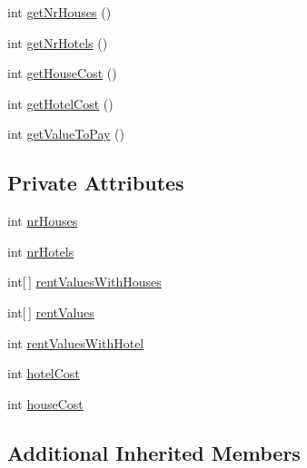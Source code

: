 \begin{DoxyCompactItemize}
\item 
int \hyperlink{class_monopoly_1_1_logic_1_1_normal_property_a17994f04f81b1494dcc4dec0b30c1bca}{get\+Nr\+Houses} ()
\item 
int \hyperlink{class_monopoly_1_1_logic_1_1_normal_property_a1ea1cfe8cea8ef479ea935e1ac221369}{get\+Nr\+Hotels} ()
\item 
int \hyperlink{class_monopoly_1_1_logic_1_1_normal_property_a09771e07034d21b288f0cb8afd0e4368}{get\+House\+Cost} ()
\item 
int \hyperlink{class_monopoly_1_1_logic_1_1_normal_property_ac69e1342451e1a6f435c4d5b1f86be7d}{get\+Hotel\+Cost} ()
\item 
int \hyperlink{class_monopoly_1_1_logic_1_1_normal_property_a9d90ab9578fe29eb12cc61ea00313e50}{get\+Value\+To\+Pay} ()
\end{DoxyCompactItemize}
\subsection*{Private Attributes}
\begin{DoxyCompactItemize}
\item 
int \hyperlink{class_monopoly_1_1_logic_1_1_normal_property_a7e951cc0cdfc94ab74fffa59d8bd32db}{nr\+Houses}
\item 
int \hyperlink{class_monopoly_1_1_logic_1_1_normal_property_a7f62c52daa430cbf8ea0b6ebf15ada1f}{nr\+Hotels}
\item 
int\mbox{[}$\,$\mbox{]} \hyperlink{class_monopoly_1_1_logic_1_1_normal_property_a918c6693fd0638db23698322ae3fdad3}{rent\+Values\+With\+Houses}
\item 
int\mbox{[}$\,$\mbox{]} \hyperlink{class_monopoly_1_1_logic_1_1_normal_property_aae8931ab4d7d9ca32d507ca34141e48d}{rent\+Values}
\item 
int \hyperlink{class_monopoly_1_1_logic_1_1_normal_property_af1d8fcccf72faa5a718594967213ba55}{rent\+Values\+With\+Hotel}
\item 
int \hyperlink{class_monopoly_1_1_logic_1_1_normal_property_a59afe77a19e7be091e59408b8d25f4f6}{hotel\+Cost}
\item 
int \hyperlink{class_monopoly_1_1_logic_1_1_normal_property_af9453c7887211e8305c482b065b3909b}{house\+Cost}
\end{DoxyCompactItemize}
\subsection*{Additional Inherited Members}


